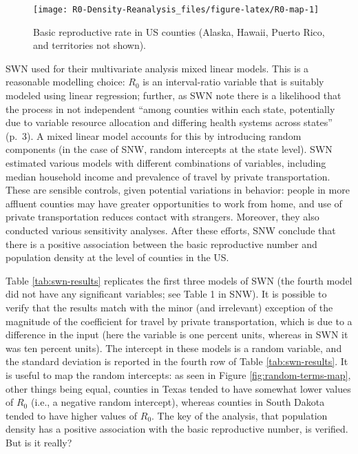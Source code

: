 \documentclass[10pt,letterpaper]{article}
\begin{document}
\begin{figure}
\texttt{[image: R0-Density-Reanalysis\_files/figure-latex/R0-map-1]} \caption{\label{fig:R0-map}Basic reproductive rate in US counties (Alaska, Hawaii, Puerto Rico, and territories not shown).}\label{fig:R0-map}
\end{figure}

SWN used for their multivariate analysis mixed linear models. This is a
reasonable modelling choice: \(R_0\) is an interval-ratio variable that
is suitably modeled using linear regression; further, as SWN note there
is a likelihood that the process in not independent ``among counties
within each state, potentially due to variable resource allocation and
differing health systems across states'' (p.~3). A mixed linear model
accounts for this by introducing random components (in the case of SNW,
random intercepts at the state level). SWN estimated various models with
different combinations of variables, including median household income
and prevalence of travel by private transportation. These are sensible
controls, given potential variations in behavior: people in more
affluent counties may have greater opportunities to work from home, and
use of private transportation reduces contact with strangers. Moreover,
they also conducted various sensitivity analyses. After these efforts,
SNW conclude that there is a positive association between the basic
reproductive number and population density at the level of counties in
the US.

Table \ref{tab:swn-results} replicates the first three models of SWN
(the fourth model did not have any significant variables; see Table 1 in
SNW). It is possible to verify that the results match with the minor
(and irrelevant) exception of the magnitude of the coefficient for
travel by private transportation, which is due to a difference in the
input (here the variable is one percent units, whereas in SWN it was ten
percent units). The intercept in these models is a random variable, and
the standard deviation is reported in the fourth row of Table
\ref{tab:swn-results}. It is useful to map the random intercepts: as
seen in Figure \ref{fig:random-terms-map}, other things being equal,
counties in Texas tended to have somewhat lower values of \(R_0\) (i.e.,
a negative random intercept), whereas counties in South Dakota tended to
have higher values of \(R_0\). The key of the analysis, that population
density has a positive association with the basic reproductive number,
is verified. But is it really?
\end{document}
